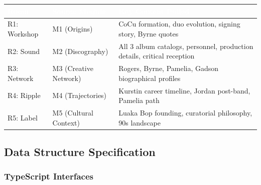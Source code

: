 \documentclass[11pt,letterpaper]{article}
\newcommand{\tableheader}[1]{\textbf{\sffamily\textcolor{white}{#1}}}
\begin{document}
\begin{center}
\begin{tabularx}{\textwidth}{L{2.5cm}L{3cm}X}
\toprule
{}
\tableheader{Room} & \tableheader{Source Module} & \tableheader{Key Content Pulled} \\
\midrule
R1: Workshop & M1 (Origins) & CoCu formation, duo evolution, signing story, Byrne quotes \\
R2: Sound & M2 (Discography) & All 3 album catalogs, personnel, production details, critical reception \\
R3: Network & M3 (Creative Network) & Rogers, Byrne, Pamelia, Gadson biographical profiles \\
R4: Ripple & M4 (Trajectories) & Kurstin career timeline, Jordan post-band, Pamelia path \\
R5: Label & M5 (Cultural Context) & Luaka Bop founding, curatorial philosophy, 90s landscape \\
\bottomrule
\end{tabularx}
\end{center}

\subsection{Data Structure Specification}

\subsubsection{TypeScript Interfaces}
\end{document}
